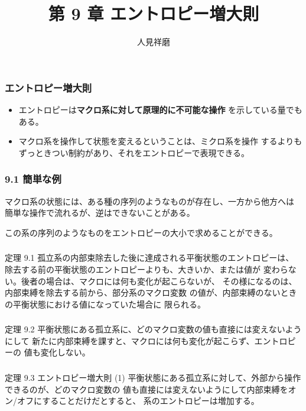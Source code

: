 \documentclass[aspectratio=149]{beamer}
\author{人見祥磨}
\title{第 9 章 エントロピー増大則}
\newcommand{\hmemph}[1]{\textbf{#1}}
\begin{document}
\begin{frame}
	\maketitle
\end{frame}

\begin{frame}
	\frametitle{エントロピー増大則}
	\begin{itemize}
		\item エントロピーは\hmemph{マクロ系に対して原理的に不可能な操作}
			を示している量でもある。
		\item マクロ系を操作して状態を変えるということは、ミクロ系を操作
			するよりもずっときつい制約があり、それをエントロピーで表現できる。
	\end{itemize}
\end{frame}

\begin{frame}
	\frametitle{9.1 簡単な例}
	マクロ系の状態には、ある種の序列のようなものが存在し、一方から他方へは
	簡単な操作で流れるが、逆はできないことがある。
	
	この系の序列のようなものをエントロピーの大小で求めることができる。
\end{frame}

\begin{frame}
	\frametitle{}
	\begin{block}{定理 9.1}
		孤立系の内部束除去した後に達成される平衡状態のエントロピーは、
		除去する前の平衡状態のエントロピーよりも、大きいか、または値が
		変わらない。後者の場合は、マクロには何も変化が起こらないが、
		その様になるのは、内部束縛を除去する前から、部分系のマクロ変数
		の値が、内部束縛のないときの平衡状態における値になっていた場合に
		限られる。
	\end{block}
\end{frame}

\begin{frame}
	\frametitle{}
	\begin{block}{定理 9.2}
		平衡状態にある孤立系に、どのマクロ変数の値も直接には変えないようにして
		新たに内部束縛を課すと、マクロには何も変化が起こらず、エントロピーの
		値も変化しない。
	\end{block}
\end{frame}

\begin{frame}
	\frametitle{}
	\begin{block}{定理 9.3 エントロピー増大則 (1)}
		平衡状態にある孤立系に対して、外部から操作できるのが、どのマクロ変数の
		値も直接には変えないようにして内部束縛をオン/オフにすることだけだとすると、
		系のエントロピーは増加する。
	\end{block}
\end{frame}
\end{document}
